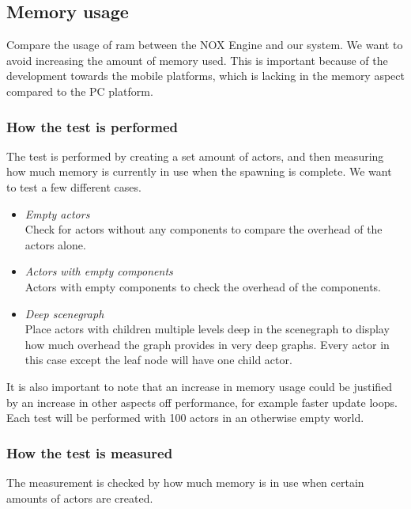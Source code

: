 \subsection{Memory usage}
Compare the usage of ram between the NOX Engine and our system.
We want to avoid increasing the amount of memory used.
This is important because of the development towards the mobile platforms, which is lacking in the memory aspect compared to the PC platform.

\subsubsection*{How the test is performed}
The test is performed by creating a set amount of actors, and then measuring how much memory is currently in use when the spawning is complete.
We want to test a few different cases.

\begin{itemize}

    \item\noindent\textit{Empty actors}\\
    Check for actors without any components to compare the overhead of the actors alone.

    \item\noindent\textit{Actors with empty components}\\
    Actors with empty components to check the overhead of the components.

    \item\noindent\textit{Deep scenegraph}\\
    Place actors with children multiple levels deep in the scenegraph to display how much overhead the graph provides in very deep graphs.
    Every actor in this case except the leaf node will have one child actor.


\end{itemize}

\noindent It is also important to note that an increase in memory usage could be justified by an increase in other aspects off performance, for example faster update loops.
Each test will be performed with 100 actors in an otherwise empty world.

\subsubsection*{How the test is measured}
The measurement is checked by how much memory is in use when certain amounts of actors are created.
